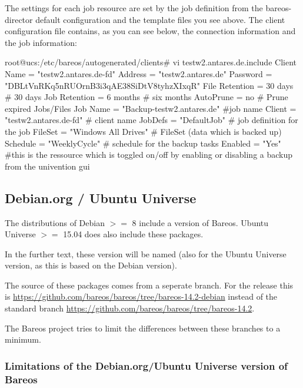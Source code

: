 The settings for each job resource are set by the job definition from the bareos-director default configuration and the template files you see above. The client configuration file contains, as you can see below, the connection information and the job information:

\begin{commands}{}
root@ucs:/etc/bareos/autogenerated/clients# vi testw2.antares.de.include
Client {
 Name = "testw2.antares.de-fd"
 Address = "testw2.antares.de"
 Password = "DBLtVnRKq5nRUOrnB3i3qAE38SiDtV8tyhzXIxqR"
 File Retention = 30 days # 30 days
 Job Retention = 6 months # six months
 AutoPrune = no # Prune expired Jobs/Files
}
Job {
 Name = "Backup-testw2.antares.de" #job name
 Client = "testw2.antares.de-fd" # client name
 JobDefs = "DefaultJob" # job definition for the job
 FileSet = "Windows All Drives" # FileSet (data which is backed up)
 Schedule = "WeeklyCycle" # schedule for the backup tasks
 Enabled = "Yes" #this is the ressource which is toggled on/off by enabling or disabling a backup from the univention gui
 }
\end{commands}



\subsection{Debian.org / Ubuntu Universe}
\label{sec:DebianOrg}

The distributions of Debian $>=$ 8 include a version of Bareos.
Ubuntu Universe $>=$ 15.04 does also include these packages. 

In the further text, these version will be named  
(also for the Ubuntu Universe version, as this is based on the Debian version).

The source of these packages comes from a seperate branch.
For the release  this is
\url{https://github.com/bareos/bareos/tree/bareos-14.2-debian} instead of the standard branch \url{https://github.com/bareos/bareos/tree/bareos-14.2}.

The Bareos project tries to limit the differences between these branches to a minimum.

\subsubsection{Limitations of the Debian.org/Ubuntu Universe version of Bareos}
\label{sec:DebianOrgLimitations}

